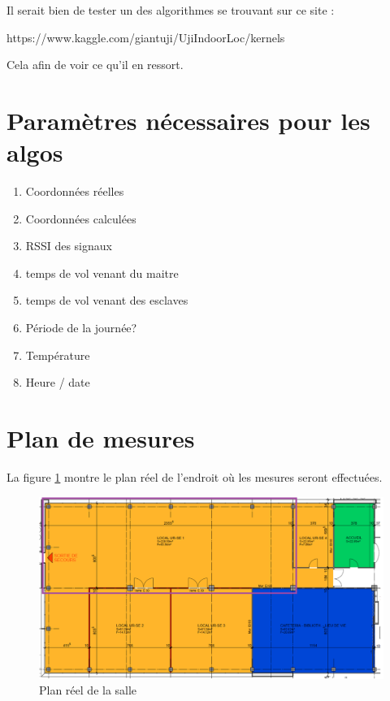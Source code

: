 Il serait bien de tester un des algorithmes se trouvant sur ce site :

https://www.kaggle.com/giantuji/UjiIndoorLoc/kernels

Cela afin de voir ce qu'il en ressort.


\section{Paramètres nécessaires pour les algos}

\begin{enumerate}
	\item Coordonnées réelles
	\item Coordonnées calculées
	\item RSSI des signaux
	\item temps de vol venant du maitre
	\item temps de vol venant des esclaves
	\item Période de la journée?
	\item Température
	\item Heure / date
\end{enumerate}

\section{Plan de mesures}
La figure \ref{fig:PlanRe} montre le plan réel de l'endroit où les mesures seront effectuées.
\begin{figure}[H]
	\begin{center}
		\includegraphics[scale=0.4]{figures/PlanRe.png}
		\caption{Plan réel de la salle}
		\label{fig:PlanRe} %
	\end{center}
\end{figure}

